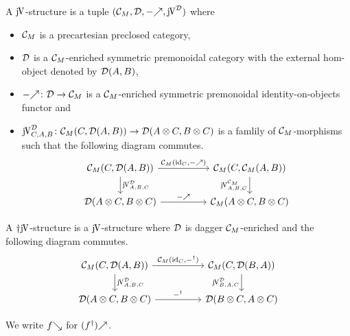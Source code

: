 \documentclass[runningheads,envcountsame]{llncs}
\newcommand{\monad}{M}
\newcommand{\homCM}[3][]{\homJ{#2}{\C_\monad}{#3}}
\begin{document}
\begin{definition}
    A $\juncurry$-structure is a tuple $(\C_\monad, \D, \f{-}, \juncurry[\D])$ where 
    \begin{itemize}
        \item $\C_\monad$ is a precartesian preclosed category,
        \item $\mathcal{D}$ is a $\C_\monad$-enriched symmetric premonoidal category with the external hom-object denoted by $\mathcal{D}(A, B)$,
        \item $\f{-}\colon \D \to \C_\monad$ is a $\C_\monad$-enriched symmetric premonoidal identity-on-objects functor and
        \item $\juncurry[\D]_{C,A,B}\colon \homCM{C}{\homD{A}{B}} \to \homD{\tensor{A}{C}}{\tensor{B}{C}}$ is a famlily of $\C_\monad$-morphisms such that  the following diagram commutes. \\
        \begin{equation}
        \begin{tikzcd}[column sep=normal]
        {\C_\monad(C, \homD{A}{B})} \ar[rr, "{\C_\monad(\id_C, \f{-})}"] \ar[d, "{\juncurry[\D]_{A,B,C}}"] & & 
        {\C_\monad(C, \homCM{A}{B})} \ar[d, swap, "{\juncurry[\C_\monad]_{A,B,C}}"] \\
        {\D(\tensor{A}{C}, \tensor{B}{C})} \ar[rr, "{\f{-}}"]
        & & \C_\monad(\tensor{A}{C}, \tensor{B}{C})
        \end{tikzcd}
        \end{equation}
    \end{itemize}
    
    A $\dagger\juncurry$-structure is a $\juncurry$-structure where $\mathcal{D}$ is dagger $\C_\monad$-enriched and the following diagram commutes. \\
    \begin{equation}
    \begin{tikzcd}[column sep=normal]
    {\C_\monad(C, \homD{A}{B})} \ar[rr, "{\C_\monad(\id_C, \rev{-})}"] \ar[d, "{\juncurry[\D]_{A,B,C}}"] & & 
    {\C_\monad(C, \homD{B}{A})} \ar[d, swap, "{\juncurry[\D]_{B,A,C}}"] \\
    {\D(\tensor{A}{C}, \tensor{B}{C})} \ar[rr, "{\rev{-}}"]
    & & \D(\tensor{B}{C}, \tensor{A}{C})
    \end{tikzcd}
    \end{equation}
    
    We write $\b{f}$ for $\f{(\rev{f})}$.
\end{definition}
\end{document}
